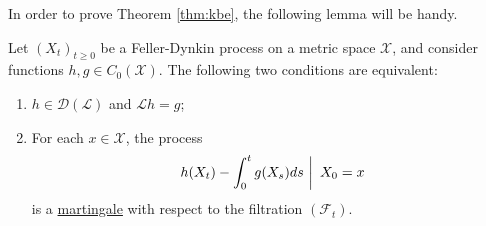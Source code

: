 In order to prove Theorem \ref{thm:kbe}, the following lemma will be
handy.

\begin{lemma}\label{lem:martingale-generator}
  Let $(X_t)_{t\geq 0}$ be a Feller-Dynkin process on a metric space
  $\mathcal{X}$, and consider functions $h, g\in
  C_0(\mathcal{X})$. The following two conditions are equivalent:
  \begin{enumerate}
  \item $h\in\mathscr{D}(\mathscr{L})$ and $\mathscr{L}h = g$;
  \item For each $x\in\mathcal{X}$, the process
    \begin{equation*}
      \left. h(X_t) - \int_0^tg(X_s)ds\ \right\rvert\ X_0 = x
    \end{equation*}
    is a \hyperref[app:martingale]{martingale} with respect to
    the filtration $(\mathcal{F}_t)$.
  \end{enumerate}
\end{lemma}

